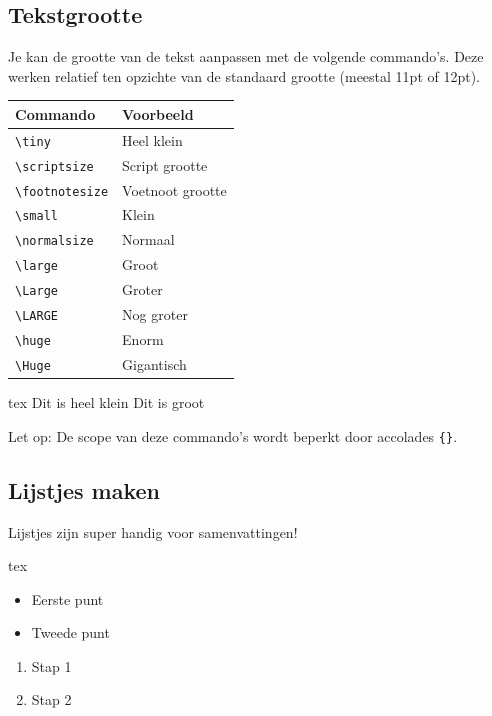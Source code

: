 \documentclass[a4paper,11pt]{article}
\begin{document}
\subsection{Tekstgrootte}
Je kan de grootte van de tekst aanpassen met de volgende commando's. Deze werken relatief ten opzichte van de standaard grootte (meestal 11pt of 12pt).

\begin{tabular}{ll}
\toprule
\textbf{Commando} & \textbf{Voorbeeld} \\
\midrule
\verb|\tiny| & {\tiny Heel klein} \\
\verb|\scriptsize| & {\scriptsize Script grootte} \\
\verb|\footnotesize| & {\footnotesize Voetnoot grootte} \\
\verb|\small| & {\small Klein} \\
\verb|\normalsize| & {\normalsize Normaal} \\
\verb|\large| & {\large Groot} \\
\verb|\Large| & {\Large Groter} \\
\verb|\LARGE| & {\LARGE Nog groter} \\
\verb|\huge| & {\huge Enorm} \\
\verb|\Huge| & {\Huge Gigantisch} \\
\bottomrule
\end{tabular}

\begin{codeblock}[Voorbeeld]{tex}
{\tiny Dit is heel klein}
{\Large Dit is groot}
\end{codeblock}

Let op: De scope van deze commando's wordt beperkt door accolades \texttt{\{\}}.

\subsection{Lijstjes maken}
Lijstjes zijn super handig voor samenvattingen!

\begin{codeblock}[Opsommingen]{tex}
\begin{itemize}
    \item Eerste punt
    \item Tweede punt
\end{itemize}

\begin{enumerate}
    \item Stap 1
    \item Stap 2
\end{enumerate}
\end{codeblock}
\end{document}
